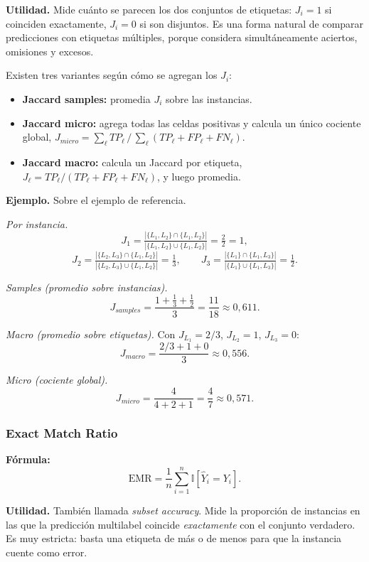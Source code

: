 \documentclass[12pt,oneside]{report}
\newcommand{\ind}{\mathbb{I}} %
\begin{document}
\textbf{Utilidad.} Mide cuánto se parecen los dos conjuntos de
etiquetas: $J_i=1$ si coinciden exactamente, $J_i=0$ si son disjuntos.
Es una forma natural de comparar predicciones con etiquetas múltiples,
porque considera simultáneamente aciertos, omisiones y excesos.

Existen tres variantes según cómo se agregan los $J_i$:
\begin{itemize}[leftmargin=*]
  \item \textbf{Jaccard samples:} promedia $J_i$ sobre las instancias.
  \item \textbf{Jaccard micro:} agrega todas las celdas positivas y
  calcula un único cociente global, $J_{micro}=\sum_\ell TP_\ell\,/\,\sum_\ell(TP_\ell+FP_\ell+FN_\ell)$.
  \item \textbf{Jaccard macro:} calcula un Jaccard por etiqueta,
  $J_\ell=TP_\ell/(TP_\ell+FP_\ell+FN_\ell)$, y luego promedia.
\end{itemize}

\textbf{Ejemplo.} Sobre el ejemplo de referencia.

\emph{Por instancia.}
\[
J_1=\tfrac{|\{L_1,L_2\}\cap\{L_1,L_2\}|}{|\{L_1,L_2\}\cup\{L_1,L_2\}|}=\tfrac{2}{2}=1,
\]
\[
J_2=\tfrac{|\{L_2,L_3\}\cap\{L_1,L_2\}|}{|\{L_2,L_3\}\cup\{L_1,L_2\}|}=\tfrac{1}{3},\qquad
J_3=\tfrac{|\{L_1\}\cap\{L_1,L_3\}|}{|\{L_1\}\cup\{L_1,L_3\}|}=\tfrac{1}{2}.
\]

\emph{Samples (promedio sobre instancias).}
\[
J_{samples}=\frac{1+\tfrac{1}{3}+\tfrac{1}{2}}{3}=\frac{11}{18}\approx 0{,}611.
\]

\emph{Macro (promedio sobre etiquetas).} Con $J_{L_1}=2/3$,
$J_{L_2}=1$, $J_{L_3}=0$:
\[
J_{macro}=\frac{2/3+1+0}{3}\approx 0{,}556.
\]

\emph{Micro (cociente global).}
\[
J_{micro}=\frac{4}{4+2+1}=\frac{4}{7}\approx 0{,}571.
\]

\subsubsection{Exact Match Ratio}

\textbf{Fórmula:}
\[
\mathrm{EMR}=\frac{1}{n}\sum_{i=1}^n \ind[\hat{Y}_i = Y_i].
\]

\textbf{Utilidad.} También llamada \emph{subset accuracy}. Mide la
proporción de instancias en las que la predicción multilabel coincide
\emph{exactamente} con el conjunto verdadero. Es muy estricta: basta una
etiqueta de más o de menos para que la instancia cuente como error.
\end{document}
